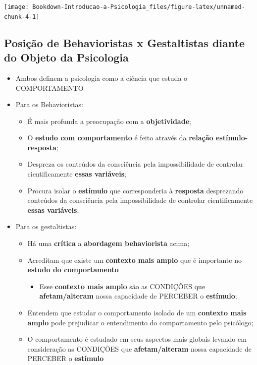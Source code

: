 \documentclass[
]{book}
\providecommand{\tightlist}{%
  \setlength{\itemsep}{0pt}\setlength{\parskip}{0pt}}
\begin{document}
\texttt{[image: Bookdown-Introducao-a-Psicologia\_files/figure-latex/unnamed-chunk-4-1]}

\hypertarget{posiuxe7uxe3o-de-behavioristas-x-gestaltistas-diante-do-objeto-da-psicologia}{%
\subsection{Posição de Behavioristas x Gestaltistas diante do Objeto da Psicologia}\label{posiuxe7uxe3o-de-behavioristas-x-gestaltistas-diante-do-objeto-da-psicologia}}

\begin{itemize}
\tightlist
\item
  Ambos definem a psicologia como a ciência que estuda o
  COMPORTAMENTO
\item
  Para os Behavioristas:

  \begin{itemize}
  \tightlist
  \item
    É mais profunda a preocupação com a \textbf{objetividade};
  \item
    O \textbf{estudo com comportamento} é feito através da \textbf{relação
    estímulo-resposta};
  \item
    Despreza os conteúdos da consciência pela
    impossibilidade de controlar cientificamente \textbf{essas
    variáveis};
  \item
    Procura isolar o \textbf{estímulo} que corresponderia à \textbf{resposta}
    desprezando conteúdos da consciência pela
    impossibilidade de controlar cientificamente \textbf{essas
    variáveis};
  \end{itemize}
\item
  Para os gestaltistas:

  \begin{itemize}
  \tightlist
  \item
    Há uma \textbf{crítica} a \textbf{abordagem behaviorista} acima;
  \item
    Acreditam que existe um \textbf{contexto mais amplo} que é importante
    no \textbf{estudo do comportamento}

    \begin{itemize}
    \tightlist
    \item
      Esse \textbf{contexto mais amplo} são as
      CONDIÇÕES que \textbf{afetam/alteram} nossa
      capacidade de PERCEBER o \textbf{estímulo};
    \end{itemize}
  \item
    Entendem que estudar o comportamento isolado de um \textbf{contexto
    mais amplo} pode prejudicar o entendimento do comportamento
    pelo psicólogo;
  \item
    O comportamento é estudado em seus aspectos mais globais levando
    em consideração as CONDIÇÕES que
    \textbf{afetam/alteram} nossa capacidade de
    PERCEBER o \textbf{estímulo}
  \end{itemize}
\end{itemize}
\end{document}
